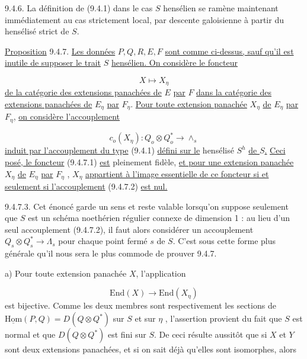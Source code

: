 9.4.6. La définition de (9.4.1) dans le cas $S$ hensélien se ramène maintenant immédiatement au cas strictement local, par descente galoisienne à partir du hensélisé strict de $S$.

\underline{Proposition} 9.4.7. \underline{Les données} $P,Q,R,E,F$ \underline{sont comme ci-dessus, sauf qu'il est inutile de supposer le trait} $S$ \underline{hensélien. On considère le foncteur}

\begin{equation}\tag{9.4.7.1}
X \longmapsto X_\eta
\end{equation}
\underline{de la catégorie des extensions panachées de} $E$ \underline{par} $F$ \underline{dans la catégorie des extensions panachées de} $E_\eta$ \underline{par} $F_\eta$. \underline{Pour toute extension panachée} $X_\eta$ \underline{de} $E_\eta$ \underline{par} $F_\eta$, \underline{on considère l'accouplement}

\begin{equation}\tag{9.4.7.2}
c_o(X_\eta) : Q_o \otimes Q_o^* \longrightarrow \wedge_s
\end{equation}
\underline{induit par l'accouplement du type} (9.4.1) \underline{défini sur le} hensélisé $S^h$ \underline{de $S$.} \underline{Ceci posé, le foncteur} (9.4.7.1) \underline{est} pleinement fidèle, \underline{et pour une extension panachée} $X_\eta$ \underline{de} $E_\eta$ \underline{par} $F_\eta$ , $X_\eta$ \underline{appartient à l'image essentielle de ce foncteur si et seulement si l'accouplement} (9.4.7.2) \underline{est nul.}



9.4.7.3.  Cet énoncé garde un sens et reste valable lorsqu'on suppose seulement que $S$ est un schéma noethérien régulier connexe de dimension 1 : au lieu d'un seul accouplement (9.4.7.2), il faut alors considérer un accouplement $Q_s \otimes Q_s^* \longrightarrow \Lambda_s$ pour chaque point fermé $s$ de $S$. C'est sous cette forme plus générale qu'il nous sera le plus commode de prouver 9.4.7.

a)  Pour toute extension panachée $X$, l'application

\begin{equation*}
\mathrm{End}(X) \longrightarrow \mathrm{End}(X_\eta)
\end{equation*}
est bijective. Comme les deux membres sont respectivement les sections de $\underline{\mathrm{Hom}}(P,Q) = D(Q \otimes Q^*)$ sur $S$ et sur $\eta$ , l'assertion provient du fait que $S$ est normal et que $D(Q \otimes Q^*)$ est fini sur $S$. De ceci résulte aussitôt que si $X$ et $Y$ sont deux extensions panachées, et si on sait déjà qu'elles sont isomorphes, alors

